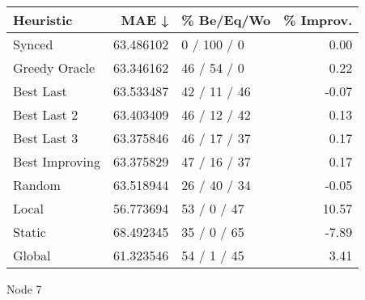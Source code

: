\begin{tabular}{lrlr}
\toprule
      Heuristic &      MAE ↓ &    \% Be/Eq/Wo & \% Improv. \\
\midrule
         Synced &  63.486102 &   0 / 100 / 0 &      0.00 \\
  Greedy Oracle &  63.346162 &   46 / 54 / 0 &      0.22 \\
      Best Last &  63.533487 &  42 / 11 / 46 &     -0.07 \\
    Best Last 2 &  63.403409 &  46 / 12 / 42 &      0.13 \\
    Best Last 3 &  63.375846 &  46 / 17 / 37 &      0.17 \\
 Best Improving &  63.375829 &  47 / 16 / 37 &      0.17 \\
         Random &  63.518944 &  26 / 40 / 34 &     -0.05 \\
          Local &  56.773694 &   53 / 0 / 47 &     10.57 \\
         Static &  68.492345 &   35 / 0 / 65 &     -7.89 \\
         Global &  61.323546 &   54 / 1 / 45 &      3.41 \\
\bottomrule
\end{tabular}
\caption{Node 7}
\label{tab:non_lr005_le1_bs2_7}
